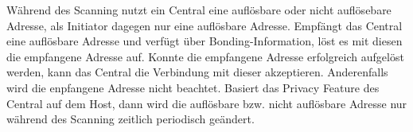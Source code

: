 Während des Scanning nutzt ein Central eine auflösbare oder nicht auflösebare Adresse, als Initiator dagegen nur eine auflösbare Adresse. Empfängt das Central eine auflösbare Adresse und verfügt über Bonding-Information, löst es mit diesen die empfangene Adresse auf. Konnte die empfangene Adresse erfolgreich aufgelöst werden, kann das Central die Verbindung mit dieser akzeptieren. Anderenfalls wird die enpfangene Adresse nicht beachtet. Basiert das Privacy Feature des Central auf dem Host, dann wird die auflösbare bzw. nicht auflösbare Adresse nur während des Scanning zeitlich periodisch geändert.
